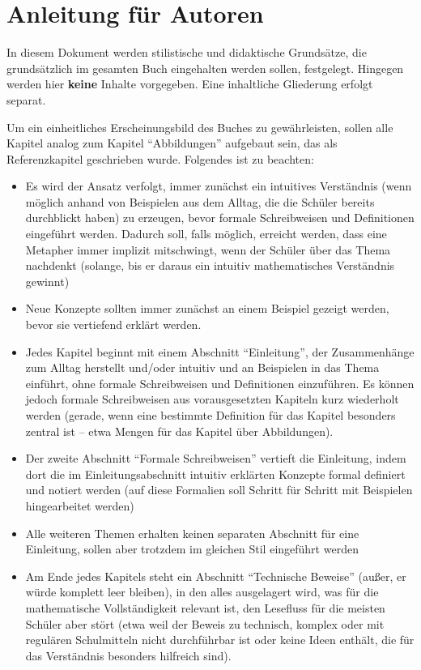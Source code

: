 \documentclass{article}
\begin{document}
\section*{Anleitung für Autoren}

In diesem Dokument werden stilistische und didaktische Grundsätze, die grundsätzlich im gesamten Buch eingehalten werden sollen, festgelegt. Hingegen werden hier \textbf{keine} Inhalte vorgegeben. Eine inhaltliche Gliederung erfolgt separat.

Um ein einheitliches Erscheinungsbild des Buches zu gewährleisten, sollen alle Kapitel analog zum Kapitel \enquote{Abbildungen} aufgebaut sein, das als Referenzkapitel geschrieben wurde. Folgendes ist zu beachten:

\begin{itemize}[leftmargin=.5cm]
	\item Es wird der Ansatz verfolgt, immer zunächst ein intuitives Verständnis (wenn möglich anhand von Beispielen aus dem Alltag, die die Schüler bereits durchblickt haben) zu erzeugen, bevor formale Schreibweisen und Definitionen eingeführt werden. Dadurch soll, falls möglich, erreicht werden, dass eine Metapher immer implizit mitschwingt, wenn der Schüler über das Thema nachdenkt (solange, bis er daraus ein intuitiv mathematisches Verständnis gewinnt)
	\item Neue Konzepte sollten immer zunächst an einem Beispiel gezeigt werden, bevor sie vertiefend erklärt werden.
	\item Jedes Kapitel beginnt mit einem Abschnitt \enquote{Einleitung}, der Zusammenhänge zum Alltag herstellt und/oder intuitiv und an Beispielen in das Thema einführt, ohne formale Schreibweisen und Definitionen einzuführen. Es können jedoch formale Schreibweisen aus vorausgesetzten Kapiteln kurz wiederholt werden (gerade, wenn eine bestimmte Definition für das Kapitel besonders zentral ist -- etwa Mengen für das Kapitel über Abbildungen).
	\item Der zweite Abschnitt \enquote{Formale Schreibweisen} vertieft die Einleitung, indem dort die im Einleitungsabschnitt intuitiv erklärten Konzepte formal definiert und notiert werden (auf diese Formalien soll Schritt für Schritt mit Beispielen hingearbeitet werden)
	\item Alle weiteren Themen erhalten keinen separaten Abschnitt für eine Einleitung, sollen aber trotzdem im gleichen Stil eingeführt werden
	\item Am Ende jedes Kapitels steht ein Abschnitt \enquote{Technische Beweise} (außer, er würde komplett leer bleiben), in den alles ausgelagert wird, was für die mathematische Vollständigkeit relevant ist, den Lesefluss für die meisten Schüler aber stört (etwa weil der Beweis zu technisch, komplex oder mit regulären Schulmitteln nicht durchführbar ist oder keine Ideen enthält, die für das Verständnis besonders hilfreich sind). 

\end{itemize}
\end{document}
